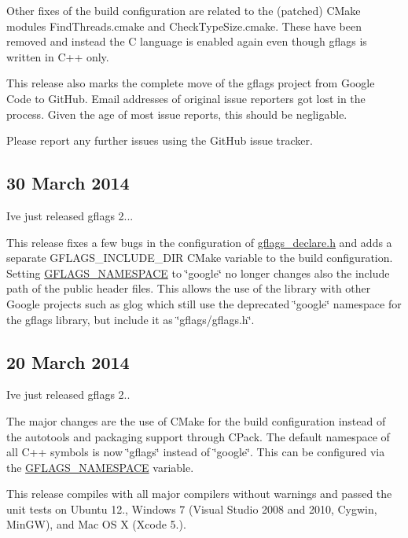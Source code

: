 Other fixes of the build configuration are related to the (patched) C\+Make modules Find\+Threads.\+cmake and Check\+Type\+Size.\+cmake. These have been removed and instead the C language is enabled again even though gflags is written in C++ only.

This release also marks the complete move of the gflags project from Google Code to Git\+Hub. Email addresses of original issue reporters got lost in the process. Given the age of most issue reports, this should be negligable.

Please report any further issues using the Git\+Hub issue tracker.

\subsection*{30 March 2014 }

I\textquotesingle{}ve just released gflags 2...

This release fixes a few bugs in the configuration of \hyperlink{gflags__declare_8h}{gflags\+\_\+declare.\+h} and adds a separate G\+F\+L\+A\+G\+S\+\_\+\+I\+N\+C\+L\+U\+D\+E\+\_\+\+D\+IR C\+Make variable to the build configuration. Setting \hyperlink{namespaceGFLAGS__NAMESPACE}{G\+F\+L\+A\+G\+S\+\_\+\+N\+A\+M\+E\+S\+P\+A\+CE} to \char`\"{}google\char`\"{} no longer changes also the include path of the public header files. This allows the use of the library with other Google projects such as glog which still use the deprecated \char`\"{}google\char`\"{} namespace for the gflags library, but include it as \char`\"{}gflags/gflags.\+h\char`\"{}.

\subsection*{20 March 2014 }

I\textquotesingle{}ve just released gflags 2..

The major changes are the use of C\+Make for the build configuration instead of the autotools and packaging support through C\+Pack. The default namespace of all C++ symbols is now \char`\"{}gflags\char`\"{} instead of \char`\"{}google\char`\"{}. This can be configured via the \hyperlink{namespaceGFLAGS__NAMESPACE}{G\+F\+L\+A\+G\+S\+\_\+\+N\+A\+M\+E\+S\+P\+A\+CE} variable.

This release compiles with all major compilers without warnings and passed the unit tests on Ubuntu 12., Windows 7 (Visual Studio 2008 and 2010, Cygwin, Min\+GW), and Mac OS X (Xcode 5.).

